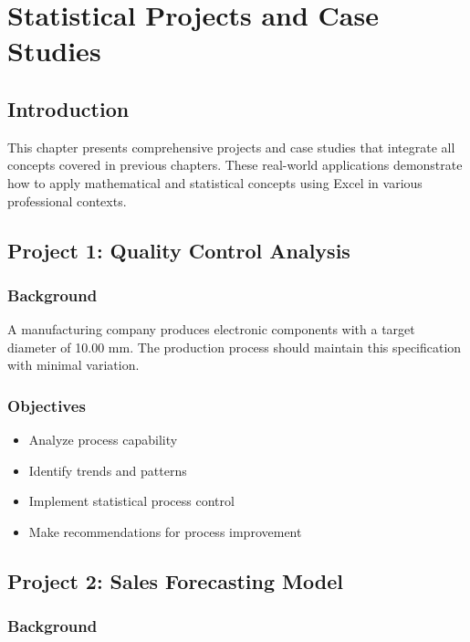 \documentclass[12pt,a4paper]{book}
\begin{document}
\chapter{Statistical Projects and Case Studies}

\section{Introduction}

This chapter presents comprehensive projects and case studies that integrate all concepts covered in previous chapters. These real-world applications demonstrate how to apply mathematical and statistical concepts using Excel in various professional contexts.

\section{Project 1: Quality Control Analysis}

\subsection{Background}

A manufacturing company produces electronic components with a target diameter of 10.00 mm. The production process should maintain this specification with minimal variation.

\subsection{Objectives}

\begin{itemize}
    \item Analyze process capability
    \item Identify trends and patterns
    \item Implement statistical process control
    \item Make recommendations for process improvement
\end{itemize}

\section{Project 2: Sales Forecasting Model}

\subsection{Background}
\end{document}
